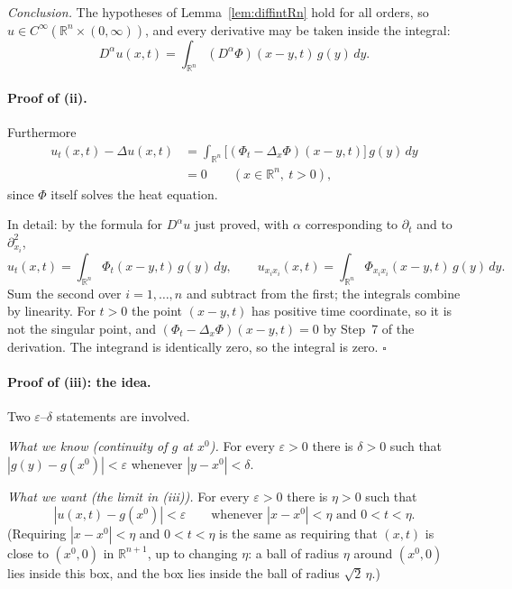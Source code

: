 \documentclass[11pt]{article}
\theoremstyle{plain}
\theoremstyle{definition}
\theoremstyle{remark}
\begin{document}
\emph{Conclusion.} The hypotheses of Lemma~\ref{lem:diffintRn} hold for all orders, so $u \in C^\infty(\mathbb{R}^n \times (0,\infty))$, and every derivative may be taken inside the integral:
$$ D^\alpha u(x,t) = \int_{\mathbb{R}^n}(D^\alpha\Phi)(x-y,t)\, g(y)\, dy. $$

\paragraph{Proof of (ii).} Furthermore
\begin{equation}\label{eq:heat10}
\begin{aligned}
u_t(x,t) - \Delta u(x,t) &= \int_{\mathbb{R}^n}\big[(\Phi_t - \Delta_x\Phi)(x - y,t)\big]\, g(y)\, dy \\
&= 0 \qquad (x \in \mathbb{R}^n,\ t > 0),
\end{aligned}
\end{equation}
since $\Phi$ itself solves the heat equation.

In detail: by the formula for $D^\alpha u$ just proved, with $\alpha$ corresponding to $\partial_t$ and to $\partial_{x_i}^2$,
$$ u_t(x,t) = \int_{\mathbb{R}^n}\Phi_t(x-y,t)\,g(y)\,dy, \qquad u_{x_ix_i}(x,t) = \int_{\mathbb{R}^n}\Phi_{x_ix_i}(x-y,t)\,g(y)\,dy. $$
Sum the second over $i = 1,\dots,n$ and subtract from the first; the integrals combine by linearity. For $t > 0$ the point $(x - y,t)$ has positive time coordinate, so it is not the singular point, and $(\Phi_t - \Delta_x\Phi)(x-y,t) = 0$ by Step~7 of the derivation. The integrand is identically zero, so the integral is zero. $\square$

\paragraph{Proof of (iii): the idea.}
Two $\varepsilon$--$\delta$ statements are involved.

\emph{What we know (continuity of $g$ at $x^0$).} For every $\varepsilon > 0$ there is $\delta > 0$ such that $|g(y) - g(x^0)| < \varepsilon$ whenever $|y - x^0| < \delta$.

\emph{What we want (the limit in (iii)).} For every $\varepsilon > 0$ there is $\eta > 0$ such that
$$ |u(x,t) - g(x^0)| < \varepsilon \qquad \text{whenever } |x - x^0| < \eta \text{ and } 0 < t < \eta. $$
(Requiring $|x - x^0| < \eta$ and $0 < t < \eta$ is the same as requiring that $(x,t)$ is close to $(x^0,0)$ in $\mathbb{R}^{n+1}$, up to changing $\eta$: a ball of radius $\eta$ around $(x^0,0)$ lies inside this box, and the box lies inside the ball of radius $\sqrt2\,\eta$.)
\end{document}
